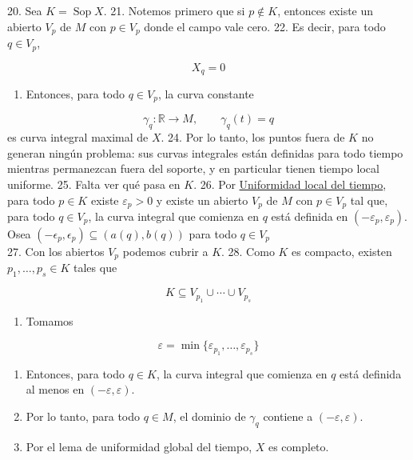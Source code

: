 \begin{bookproof}{}
20. Sea $K=\operatorname{Sop}X$. 21. Notemos primero que si $p\notin K$, entonces existe un abierto $V_p$ de $M$ con $p\in V_p$ donde el campo vale cero. 22. Es decir, para todo $q\in V_p$,

\[
X_q=0
\]
\begin{enumerate}[start=23]
\item Entonces, para todo $q\in V_p$, la curva constante
\end{enumerate}
\[
\gamma_q:\mathbb R\to M,\qquad \gamma_q(t)=q
\]
es curva integral maximal de $X$. 24. Por lo tanto, los puntos fuera de $K$ no generan ningún problema: sus curvas integrales están definidas para todo tiempo mientras permanezcan fuera del soporte, y en particular tienen tiempo local uniforme. 25. Falta ver qué pasa en $K$. 26. Por \hyperref[blk:3b18e6]{Uniformidad local del tiempo}, para todo $p\in K$ existe $\varepsilon_p>0$ y existe un abierto $V_p$ de $M$ con $p\in V_p$ tal que, para todo $q\in V_p$, la curva integral que comienza en $q$ está definida en $(-\varepsilon_p,\varepsilon_p)$. Osea $(-\epsilon_{p},\epsilon_{p})\subseteq (a(q),b(q))$ para todo $q\in V_{p}$\\
27. Con los abiertos $V_p$ podemos cubrir a $K$. 28. Como $K$ es compacto, existen $p_1,\ldots,p_s\in K$ tales que

\[
K\subseteq V_{p_1}\cup\cdots\cup V_{p_s}
\]
\begin{enumerate}[start=29]
\item Tomamos
\end{enumerate}
\[
\varepsilon=\min\{\varepsilon_{p_1},\ldots,\varepsilon_{p_s}\}
\]
\begin{enumerate}[start=30]
\item Entonces, para todo $q\in K$, la curva integral que comienza en $q$ está definida al menos en $(-\varepsilon,\varepsilon)$.
\item Por lo tanto, para todo $q\in M$, el dominio de $\gamma_q$ contiene a $(-\varepsilon,\varepsilon)$.
\item Por el lema de uniformidad global del tiempo, $X$ es completo.
\end{enumerate}
\bookqed
\end{bookproof}
